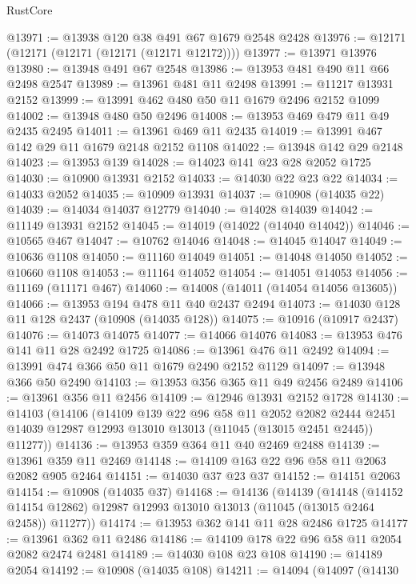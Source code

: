 \begin{lexlean}{RustCore}
\begin{coremodule}
@13971 := @13938 @120 @38 @491 @67 @1679 @2548 @2428
@13976 := @12171 (@12171 (@12171 (@12171 (@12171 @12172))))
@13977 := @13971 @13976
@13980 := @13948 @491 @67 @2548
@13986 := @13953 @481 @490 @11 @66 @2498 @2547
@13989 := @13961 @481 @11 @2498
@13991 := @11217 @13931 @2152
@13999 := @13991 @462 @480 @50 @11 @1679 @2496 @2152 @1099
@14002 := @13948 @480 @50 @2496
@14008 := @13953 @469 @479 @11 @49 @2435 @2495
@14011 := @13961 @469 @11 @2435
@14019 := @13991 @467 @142 @29 @11 @1679 @2148 @2152 @1108
@14022 := @13948 @142 @29 @2148
@14023 := @13953 @139
@14028 := @14023 @141 @23 @28 @2052 @1725
@14030 := @10900 @13931 @2152
@14033 := @14030 @22 @23 @22
@14034 := @14033 @2052
@14035 := @10909 @13931
@14037 := @10908 (@14035 @22)
@14039 := @14034 @14037 @12779
@14040 := @14028 @14039
@14042 := @11149 @13931 @2152
@14045 := @14019 (@14022 (@14040 @14042))
@14046 := @10565 @467
@14047 := @10762 @14046
@14048 := @14045 @14047
@14049 := @10636 @1108
@14050 := @11160 @14049
@14051 := @14048 @14050
@14052 := @10660 @1108
@14053 := @11164 @14052
@14054 := @14051 @14053
@14056 := @11169 (@11171 @467)
@14060 := @14008 (@14011 (@14054 @14056 @13605))
@14066 := @13953 @194 @478 @11 @40 @2437 @2494
@14073 := @14030 @128 @11 @128 @2437 (@10908 (@14035 @128))
@14075 := @10916 (@10917 @2437)
@14076 := @14073 @14075
@14077 := @14066 @14076
@14083 := @13953 @476 @141 @11 @28 @2492 @1725
@14086 := @13961 @476 @11 @2492
@14094 := @13991 @474 @366 @50 @11 @1679 @2490 @2152 @1129
@14097 := @13948 @366 @50 @2490
@14103 := @13953 @356 @365 @11 @49 @2456 @2489
@14106 := @13961 @356 @11 @2456
@14109 := @12946 @13931 @2152 @1728
@14130 := @14103
    (@14106
      (@14109
        @139
        @22
        @96
        @58
        @11
        @2052
        @2082
        @2444
        @2451
        @14039
        @12987
        @12993
        @13010
        @13013
        (@11045 (@13015 @2451 @2445))
        @11277))
@14136 := @13953 @359 @364 @11 @40 @2469 @2488
@14139 := @13961 @359 @11 @2469
@14148 := @14109 @163 @22 @96 @58 @11 @2063 @2082 @905 @2464
@14151 := @14030 @37 @23 @37
@14152 := @14151 @2063
@14154 := @10908 (@14035 @37)
@14168 := @14136
    (@14139
      (@14148
        (@14152 @14154 @12862)
        @12987
        @12993
        @13010
        @13013
        (@11045 (@13015 @2464 @2458))
        @11277))
@14174 := @13953 @362 @141 @11 @28 @2486 @1725
@14177 := @13961 @362 @11 @2486
@14186 := @14109 @178 @22 @96 @58 @11 @2054 @2082 @2474 @2481
@14189 := @14030 @108 @23 @108
@14190 := @14189 @2054
@14192 := @10908 (@14035 @108)
@14211 := @14094
    (@14097
      (@14130

\end{coremodule}
\end{lexlean}
